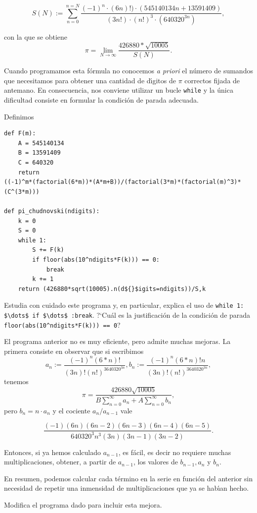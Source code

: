 \[S(N):=\sum_{n=0}^{n=N}\frac{(-1)^n\cdot (6n)!)\cdot
(545140134n+13591409)}{(3n!)\cdot (n!)^3\cdot (640320^{3n})},\]

\noindent con la que se obtiene 
\[\pi= \lim_{N\to \infty}\frac{426880*\sqrt{10005}}{S(N)}.\]

Cuando programamos esta f\'ormula no conocemos {\itshape a priori} el n\'umero
de sumandos que necesitamos para obtener una cantidad de d\'{\i}gitos de $\pi$
correctos fijada de antemano. En consecuencia, nos conviene utilizar un bucle
{\tt while} y la \'unica dificultad consiste en formular la condici\'on de
parada adecuada. 


Definimos

\begin{lstlisting}
def F(m):
    A = 545140134
    B = 13591409
    C = 640320
    return
((-1)^m*(factorial(6*m))*(A*m+B))/(factorial(3*m)*(factorial(m)^3)*(C^(3*m)))
 
def pi_chudnovski(ndigits):
    k = 0
    S = 0 
    while 1:
        S += F(k)
        if floor(abs(10^ndigits*F(k))) == 0:
            break
        k += 1
    return (426880*sqrt(10005).n(d${}$igits=ndigits))/S,k
\end{lstlisting}

Estudia con cuidado este programa y, en particular, explica el uso de 
\lstinline|while 1: $\dots$ if $\dots$ :break|. ?`Cu\'al es la justificaci\'on
de la condici\'on de
parada  \lstinline|floor(abs(10^ndigits*F(k))) == 0|?

El programa anterior no es muy eficiente, pero admite muchas mejoras. La primera
consiste en observar que si escribimos 
\[a_n:=\frac{(-1)^n(6*n)!}{(3n)!(n!)^3640320^{3n}},
b_n:=\frac{(-1)^n(6*n)!n}{(3n)!(n!)^3640320^{3n}},\]
\noindent tenemos 
\[\pi=\frac{426880\sqrt{10005}}{B\sum_{n=0}^{\infty}a_n+A\sum_{n=0}^{\infty}
b_n},\]
\noindent pero $b_n=n\cdot a_n$ y  el cociente $a_n/a_{n-1}$ vale 

\[
\frac{(-1)(6n)(6n-2)(6n-3)(6n-4)(6n-5)}{640320^3n^3(3n)(3n-1)(3n-2)}.
\]

Entonces, si ya hemos calculado $a_{n-1}$, es f\'acil, es decir no requiere muchas multiplicaciones, obtener,  a partir de $a_{n-1}$, los valores de $b_{n-1},a_n$ y $b_n$.




 En resumen, podemos calcular cada t\'ermino en la serie en
funci\'on del anterior sin necesidad de repetir una inmensidad de
multiplicaciones que ya se hab\'{\i}an hecho. 

\begin{ejer}

Modifica el programa dado para incluir esta mejora. 
\end{ejer}

